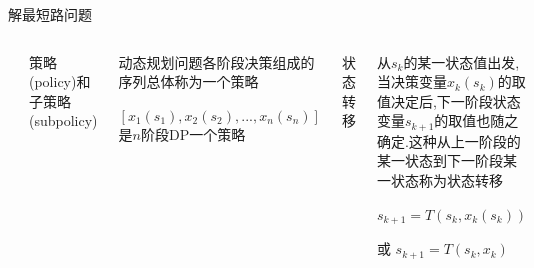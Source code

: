 \begin{frame}{解最短路问题}
    \begin{columns}
        \includegraphics[scale=.65]{fig/4-1.pdf}
            \begin{enumerate}[(4)]
                \scriptsize{\item 策略(policy)和子策略(subpolicy)}
            \end{enumerate}
            \begin{itemize}
                \scriptsize{\item 动态规划问题各阶段决策组成的序列总体称为一个策略}
                \item $[x_1(s_1),x_2(s_2),...,x_n(s_n)]$是$n$阶段DP一个策略
            \end{itemize}
            \pause
            \begin{enumerate}[(5)]
                \scriptsize{\item 状态转移}
            \end{enumerate}
            \begin{itemize}
                \scriptsize{\item 从$s_k$的某一状态值出发,当决策变量$x_k(s_k)$的取值决定后,下一阶段状态变量$s_{k+1}$的取值也随之确定.这种从上一阶段的某一状态到下一阶段某一状态称为状态转移}
                \item $s_{k+1}=T(s_k,x_k(s_k))$
                \item 或 $s_{k+1}=T(s_k,x_k)$
            \end{itemize}
    \end{columns}
\end{frame}
